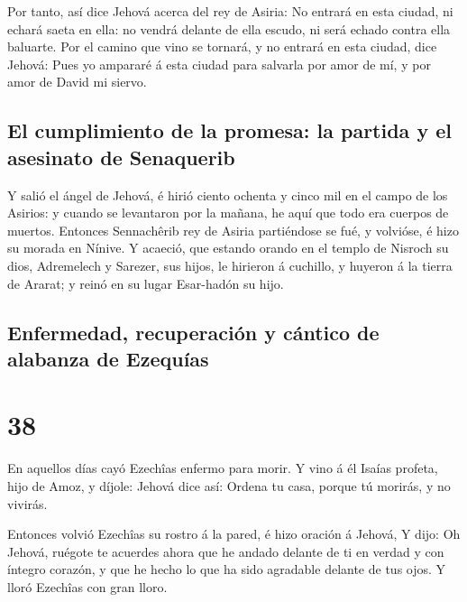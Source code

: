  Por tanto, así dice Jehová acerca del rey de Asiria: No
entrará en esta ciudad, ni echará saeta en ella: no vendrá delante de
ella escudo, ni será echado contra ella baluarte.  Por el
camino que vino se tornará, y no entrará en esta ciudad, dice Jehová:
 Pues yo ampararé á esta ciudad para salvarla por amor de
mí, y por amor de David mi siervo.

\hypertarget{el-cumplimiento-de-la-promesa-la-partida-y-el-asesinato-de-senaquerib}{%
\subsection{El cumplimiento de la promesa: la partida y el asesinato de
Senaquerib}\label{el-cumplimiento-de-la-promesa-la-partida-y-el-asesinato-de-senaquerib}}

 Y salió el ángel de Jehová, é hirió ciento ochenta y
cinco mil en el campo de los Asirios: y cuando se levantaron por la
mañana, he aquí que todo era cuerpos de muertos. 
Entonces Sennachêrib rey de Asiria partiéndose se fué, y volvióse, é
hizo su morada en Nínive.  Y acaeció, que estando orando
en el templo de Nisroch su dios, Adremelech y Sarezer, sus hijos, le
hirieron á cuchillo, y huyeron á la tierra de Ararat; y reinó en su
lugar Esar-hadón su hijo.

\hypertarget{enfermedad-recuperaciuxf3n-y-cuxe1ntico-de-alabanza-de-ezequuxedas}{%
\subsection{Enfermedad, recuperación y cántico de alabanza de
Ezequías}\label{enfermedad-recuperaciuxf3n-y-cuxe1ntico-de-alabanza-de-ezequuxedas}}

\hypertarget{section-37}{%
\section{38}\label{section-37}}

 En aquellos días cayó Ezechîas enfermo para morir. Y vino
á él Isaías profeta, hijo de Amoz, y díjole: Jehová dice así: Ordena tu
casa, porque tú morirás, y no vivirás.

 Entonces volvió Ezechîas su rostro á la pared, é hizo
oración á Jehová,  Y dijo: Oh Jehová, ruégote te acuerdes
ahora que he andado delante de ti en verdad y con íntegro corazón, y que
he hecho lo que ha sido agradable delante de tus ojos. Y lloró Ezechîas
con gran lloro.

